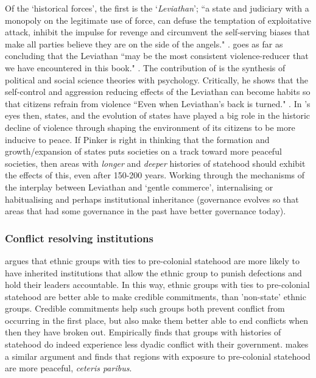 \documentclass[12pt]{article}
\begin{document}
\begin{multicols}{2}
Of the `historical forces', the first is the `\textit{Leviathan}'; ``a state and
judiciary with a monopoly on the legitimate use of force, can defuse the
temptation of exploitative attack, inhibit the impulse for revenge and
circumvent the self-serving biases that make all parties believe they are on the
side of the angels." \citep[xxvi]{Pinker2012}. \citet{Pinker2012} goes as far as
concluding that the Leviathan ``may be the most consistent violence-reducer that
we have encountered in this book." \citep[680]{Pinker2012}. The contribution of
\citet{Pinker2012} is the synthesis of political and social science theories
with psychology. Critically, he shows that the self-control and aggression
reducing effects of the Leviathan can become habits so that citizens refrain
from violence ``Even when Leviathan's back is turned." \citep[681]{Pinker2012}. In
\citet{Pinker2012}'s eyes then, states, and the evolution of states have played
a big role in the historic decline of violence through shaping the environment
of its citizens to be more inducive to peace. If Pinker is right in thinking
that the formation and growth/expansion of states puts societies on a track
toward more peaceful societies, then areas with \textit{longer} and
\textit{deeper} histories of statehood should exhibit the effects of this, even
after 150-200 years. Working through the mechanisms of the interplay between
Leviathan and `gentle commerce', internalising or habitualising and perhaps
institutional inheritance (governance evolves so that areas that had some
governance in the past have better governance today).

\subsubsection{Conflict resolving institutions}

\citet{Wig2016} argues that ethnic groups with ties to pre-colonial statehood
are more likely to have inherited institutions that allow the ethnic group to
punish defections and hold their leaders accountable.  In this way, ethnic
groups with ties to pre-colonial statehood are better able to make credible
commitments, than 'non-state' ethnic groups.  Credible commitments help such
groups both prevent conflict from occurring in the first place, but also make
them better able to end conflicts when then they have broken out.  Empirically
\citet{Wig2016} finds that groups with histories of statehood do indeed
experience less dyadic conflict with their government.
\citet{Depetris-Chauvin2016} makes a similar argument and finds that regions
with exposure to pre-colonial statehood are more peaceful, \textit{ceteris
paribus}.


\end{multicols}
\end{document}
